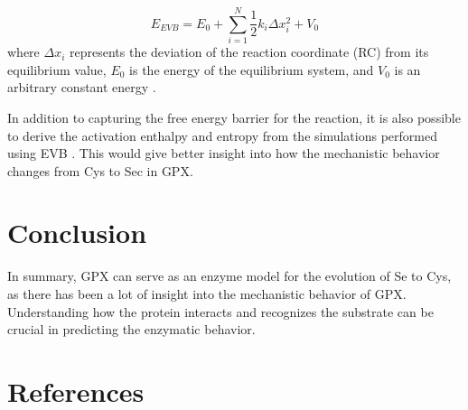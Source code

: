 \documentclass[journal=jacsat,manuscript=article]{achemso}
\begin{document}
\begin{equation}
    E_{EVB} =  E_{0} + \sum_{i=1}^{N} \frac{1}{2} k_i \Delta x_i^{2} + V_{0}
\end{equation}
where \(\Delta x_i\) represents the deviation of the reaction coordinate (RC) from its equilibrium value, \(E_0\) is the energy of the equilibrium system, and \(V_0\) is an arbitrary constant energy \cite{Oanca2024}. 

In addition to capturing the free energy barrier for the reaction, it is also possible to derive the activation enthalpy and entropy from the simulations performed using EVB \cite{Oanca2024}. This would give better insight into how the mechanistic behavior changes from Cys to Sec in GPX. 

\section{Conclusion}

In summary, GPX can serve as an enzyme model for the evolution of Se to Cys, as there has been a lot of insight into the mechanistic behavior of GPX. Understanding how the protein interacts and recognizes the substrate can be crucial in predicting the enzymatic behavior. 

\section{References}
 

\end{document}
